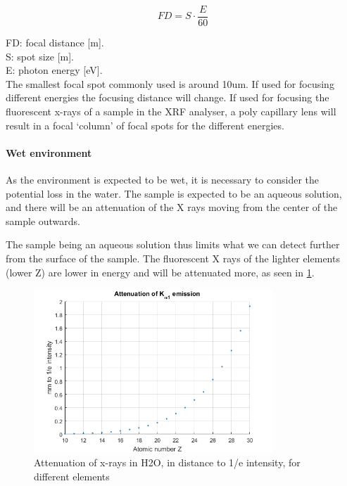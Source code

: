 \begin{equation}
FD = S \cdot \frac{E}{60}
\end{equation}

\noindent FD: focal distance [m].\\
S: spot size [m].\\
E: photon energy [eV].\\

The smallest focal spot commonly used is around 10um.
If used for focusing different energies the focusing distance will change. If used for focusing the fluorescent x-rays of a sample in the XRF analyser, a poly capillary lens will result in a focal ‘column’ of focal spots for the different energies. 


\paragraph{Wet environment}
As the environment is expected to be wet, it is necessary to consider the potential loss in the water. The sample is expected to be an aqueous solution, and there will be an attenuation of the X rays moving from the center of the sample outwards. 

The sample being an aqueous solution thus limits what we can detect further from the surface of the sample. The fluorescent X rays of the lighter elements (lower Z)  are lower in energy and will be attenuated more, as seen in \ref{fig:AttnH2O}.

\begin{figure}[h]
	\centering
	\includegraphics[width=0.8\textwidth]{figures/XRF/AttnOfKaplha.png}
	\caption{Attenuation of x-rays in H2O, in distance to 1/e intensity, for different elements\citep{XRay_Attn_H2O}}
	\label{fig:AttnH2O}
\end{figure}

